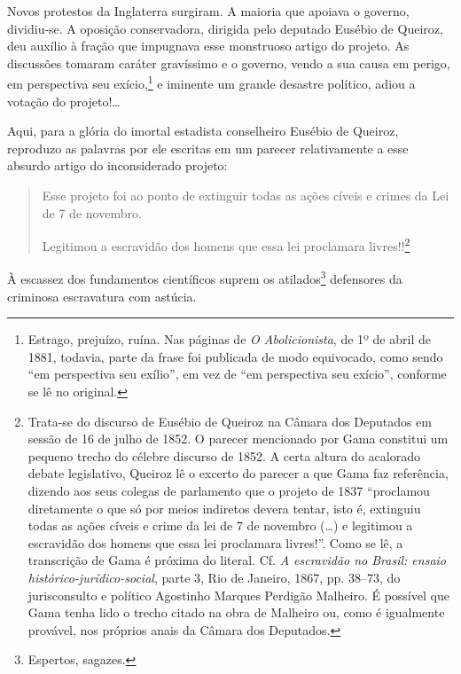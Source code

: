 Novos protestos da Inglaterra surgiram. A maioria que apoiava o governo,
dividiu-se. A oposição conservadora, dirigida pelo deputado Eusébio de
Queiroz, deu auxílio à fração que impugnava esse monstruoso artigo do
projeto. As discussões tomaram caráter gravíssimo e o governo, vendo a
sua causa em perigo, em perspectiva seu exício,\footnote{Estrago,
  prejuízo, ruína. Nas páginas de \emph{O Abolicionista}, de 1º de abril de 1881,
  todavia, parte da frase foi publicada de modo equivocado, como sendo
  ``em perspectiva seu exílio'', em vez de ``em perspectiva seu exício'',
  conforme se lê no original.} e iminente um grande desastre político,
adiou a votação do projeto!\ldots{}

Aqui, para a glória do imortal estadista conselheiro Eusébio de Queiroz,
reproduzo as palavras por ele escritas em um parecer relativamente a
esse absurdo artigo do inconsiderado projeto:

\begin{quote}
Esse projeto foi ao ponto de extinguir todas as ações cíveis e crimes
da Lei de 7 de novembro.

Legitimou a escravidão dos homens que essa lei proclamara
livres!!\footnote{Trata-se do discurso de Eusébio de Queiroz na
  Câmara dos Deputados em sessão de 16 de julho de 1852. O parecer mencionado por
  Gama constitui um pequeno trecho do célebre discurso de 1852. A certa
  altura do acalorado debate legislativo, Queiroz lê o excerto do
  parecer a que Gama faz referência, dizendo aos seus colegas de
  parlamento que o projeto de 1837 ``proclamou diretamente o que só por
  meios indiretos devera tentar, isto é, extinguiu todas as ações cíveis
  e crime da lei de 7 de novembro (\ldots{}) e legitimou a escravidão
  dos homens que essa lei proclamara livres!''. Como se lê, a transcrição
  de Gama é próxima do literal. Cf. \emph{A escravidão no Brasil: ensaio
  histórico-jurídico-social}, parte 3, Rio de Janeiro, 1867, pp. 38--73,
  do jurisconsulto e político Agostinho Marques Perdigão Malheiro. É
 possível que Gama tenha lido o trecho citado na obra de
  Malheiro ou, como é igualmente provável, nos próprios anais da Câmara
  dos Deputados.}
\end{quote}

À escassez dos fundamentos científicos suprem os atilados\footnote{
  Espertos, sagazes.} defensores da criminosa escravatura com astúcia.

